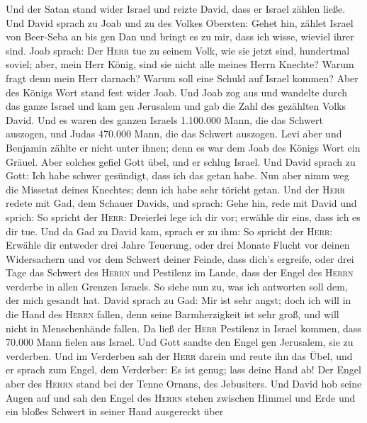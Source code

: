  Und der Satan stand wider Israel und reizte David, dass
er Israel zählen ließe.  Und David sprach zu Joab und zu
des Volkes Obersten: Gehet hin, zählet Israel von Beer-Seba an bis gen
Dan und bringt es zu mir, dass ich wisse, wieviel ihrer sind.
 Joab sprach: Der \textsc{Herr} tue zu seinem Volk, wie
sie jetzt sind, hundertmal soviel; aber, mein Herr König, sind sie nicht
alle meines Herrn Knechte? Warum fragt denn mein Herr darnach? Warum
soll eine Schuld auf Israel kommen?  Aber des Königs Wort
stand fest wider Joab. Und Joab zog aus und wandelte durch das ganze
Israel und kam gen Jerusalem  und gab die Zahl des
gezählten Volks David. Und es waren des ganzen Israels 1.100.000 Mann,
die das Schwert auszogen, und Judas 470.000 Mann, die das Schwert
auszogen.  Levi aber und Benjamin zählte er nicht unter
ihnen; denn es war dem Joab des Königs Wort ein Gräuel. 
Aber solches gefiel Gott übel, und er schlug Israel.  Und
David sprach zu Gott: Ich habe schwer gesündigt, dass ich das getan
habe. Nun aber nimm weg die Missetat deines Knechtes; denn ich habe sehr
töricht getan.  Und der \textsc{Herr} redete mit Gad, dem
Schauer Davids, und sprach:  Gehe hin, rede mit David und
sprich: So spricht der \textsc{Herr}: Dreierlei lege ich dir vor;
erwähle dir eins, dass ich es dir tue.  Und da Gad zu
David kam, sprach er zu ihm: So spricht der \textsc{Herr}: Erwähle dir
 entweder drei Jahre Teuerung, oder drei Monate Flucht
vor deinen Widersachern und vor dem Schwert deiner Feinde, dass dich's
ergreife, oder drei Tage das Schwert des \textsc{Herrn} und Pestilenz im
Lande, dass der Engel des \textsc{Herrn} verderbe in allen Grenzen
Israels. So siehe nun zu, was ich antworten soll dem, der mich gesandt
hat.  David sprach zu Gad: Mir ist sehr angst; doch ich
will in die Hand des \textsc{Herrn} fallen, denn seine Barmherzigkeit
ist sehr groß, und will nicht in Menschenhände fallen. 
Da ließ der \textsc{Herr} Pestilenz in Israel kommen, dass 70.000 Mann
fielen aus Israel.  Und Gott sandte den Engel gen
Jerusalem, sie zu verderben. Und im Verderben sah der \textsc{Herr}
darein und reute ihn das Übel, und er sprach zum Engel, dem Verderber:
Es ist genug; lass deine Hand ab! Der Engel aber des \textsc{Herrn}
stand bei der Tenne Ornans, des Jebusiters.  Und David
hob seine Augen auf und sah den Engel des \textsc{Herrn} stehen zwischen
Himmel und Erde und ein bloßes Schwert in seiner Hand ausgereckt über
